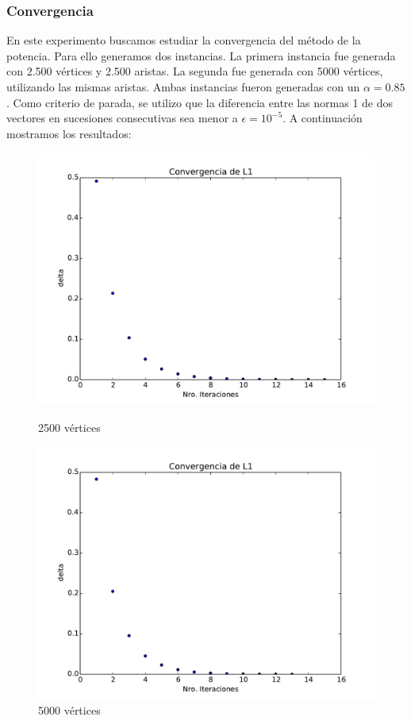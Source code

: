 \subsubsection{Convergencia}

En este experimento buscamos estudiar la convergencia del método de la potencia. Para ello generamos dos instancias. La primera instancia fue generada con 2.500 vértices y 2.500 aristas. La segunda fue generada con 5000 vértices, utilizando las mismas aristas. Ambas instancias fueron generadas con un $\alpha = 0.85$. Como criterio de parada, se utilizo que la diferencia entre las normas 1 de dos vectores en sucesiones consecutivas sea menor a $\epsilon = 10^{-5}$. A continuación mostramos los resultados:

\begin{figure}[h]
  \centering
  \begin{minipage}[b]{0.49\textwidth}
  \includegraphics[scale=0.5]{images/conv_2265.pdf}
  \caption{2500 vértices}
  \end{minipage}
  \hfill
  \begin{minipage}[b]{0.49\textwidth}
  \includegraphics[scale=0.5]{images/conv_5000.pdf}
  \caption{5000 vértices}
  \end{minipage}
\end{figure}

